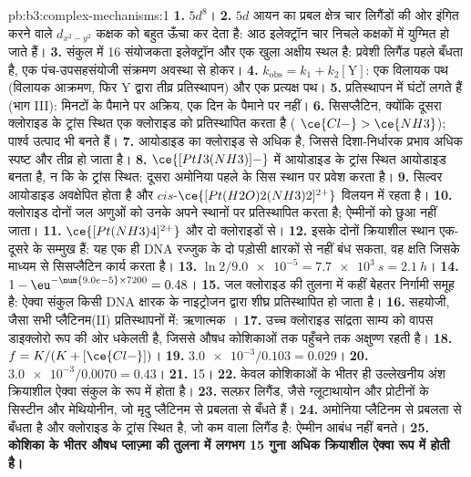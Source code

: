 \begin{solution}{pb:b3:complex-mechanisms:1}
\textbf{1.} $5d^8$।
\textbf{2.} $5d$ आयन का प्रबल क्षेत्र चार लिगैंडों की ओर इंगित करने वाले $d_{x^2-y^2}$ कक्षक को
बहुत ऊँचा कर देता है: आठ इलेक्ट्रॉन चार निचले कक्षकों में युग्मित हो जाते हैं।
\textbf{3.} संकुल में 16 संयोजकता इलेक्ट्रॉन और एक खुला अक्षीय स्थल है: प्रवेशी
लिगैंड पहले बँधता है, एक पंच-उपसहसंयोजी संक्रमण अवस्था से होकर।
\textbf{4.} $k_{\mathrm{obs}} = k_1 + k_2[\mathrm Y]$: एक विलायक पथ (विलायक आक्रमण, फिर Y द्वारा तीव्र प्रतिस्थापन)
और एक प्रत्यक्ष पथ।
\textbf{5.} प्रतिस्थापन में घंटों लगते हैं (भाग III): मिनटों के पैमाने पर अक्रिय, एक दिन के पैमाने पर
नहीं।
\textbf{6.} सिसप्लैटिन, क्योंकि दूसरा  क्लोराइड के ट्रांस स्थित एक क्लोराइड को प्रतिस्थापित करता है
( $\ce{Cl-} > \ce{NH3}$); पार्श्व उत्पाद भी बनते हैं।
\textbf{7.} आयोडाइड का  क्लोराइड से अधिक है, जिससे दिशा-निर्धारक
प्रभाव अधिक स्पष्ट और तीव्र हो जाता है।
\textbf{8.} $\ce{[PtI3(NH3)]-}$ में आयोडाइड के ट्रांस स्थित आयोडाइड  बनता है, न कि
 के ट्रांस स्थित: दूसरा अमोनिया पहले के सिस स्थान पर प्रवेश करता है।
\textbf{9.} सिल्वर आयोडाइड अवक्षेपित होता है और $cis$-$\ce{[Pt(H2O)2(NH3)2]^{2+}}$ विलयन में रहता है।
\textbf{10.} क्लोराइड दोनों जल अणुओं को उनके अपने स्थानों पर प्रतिस्थापित करता है;
ऐम्मीनों को छुआ नहीं जाता।
\textbf{11.} $\ce{[Pt(NH3)4]^{2+}}$ और दो क्लोराइडों से।
\textbf{12.} इसके दोनों क्रियाशील स्थान एक-दूसरे के सम्मुख हैं: यह एक ही DNA रज्जुक के दो
पड़ोसी क्षारकों से नहीं बंध सकता, वह क्षति जिसके माध्यम से सिसप्लैटिन
कार्य करता है।
\textbf{13.} $\ln2/\num{9.0e-5} = \qty{7.7e3}{s} = \qty{2.1}{h}$।
\textbf{14.} $1 - \eu^{-\num{9.0e-5} \times 7200} = 0.48$।
\textbf{15.} जल क्लोराइड की तुलना में कहीं बेहतर निर्गामी समूह है: ऐक्वा संकुल
किसी DNA क्षारक के नाइट्रोजन द्वारा शीघ्र प्रतिस्थापित हो जाता है।
\textbf{16.} सहयोजी, जैसा सभी प्लैटिनम(II) प्रतिस्थापनों में: ऋणात्मक ।
\textbf{17.} उच्च क्लोराइड सांद्रता साम्य को वापस
डाइक्लोरो रूप की ओर धकेलती है, जिससे औषध कोशिकाओं तक पहुँचने तक अक्षुण्ण रहती है।
\textbf{18.} $f = K/(K + [\ce{Cl-}])$।
\textbf{19.} $\num{3.0e-3}/0.103 = 0.029$।
\textbf{20.} $\num{3.0e-3}/0.0070 = 0.43$।
\textbf{21.} 15।
\textbf{22.} केवल कोशिकाओं के भीतर ही उल्लेखनीय अंश क्रियाशील ऐक्वा
संकुल के रूप में होता है।
\textbf{23.} सल्फ़र लिगैंड, जैसे ग्लूटाथायोन और प्रोटीनों के सिस्टीन और मेथियोनीन,
जो मृदु प्लैटिनम से प्रबलता से बँधते हैं।
\textbf{24.} अमोनिया प्लैटिनम से प्रबलता से बँधता है और क्लोराइड के ट्रांस स्थित है, जो
कम  वाला लिगैंड है: ऐम्मीन आबंध  नहीं बनते।
\textbf{25.} \textbf{कोशिका के भीतर औषध प्लाज़्मा की तुलना में लगभग 15 गुना अधिक
क्रियाशील ऐक्वा रूप में होती है।}
\end{solution}
